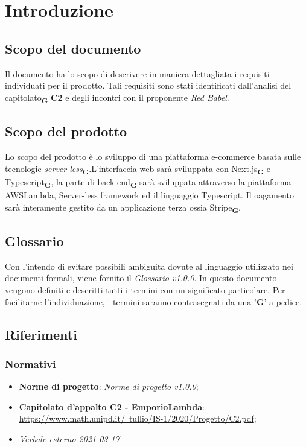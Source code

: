 \section{Introduzione}
    \subsection{Scopo del documento}
    Il documento ha lo scopo di descrivere in maniera dettagliata i requisiti individuati per il prodotto. Tali requisiti sono stati identificati dall'analisi del capitolato\textsubscript{\textbf{G}} \textbf{C2} e degli incontri con il proponente \textit{Red Babel}.
    \subsection{Scopo del prodotto}
    Lo scopo del prodotto è lo sviluppo di una piattaforma e-commerce basata sulle tecnologie \textit{server-less}\textsubscript{\textbf{G}}.L'interfaccia web sarà sviluppata con Next.js\textsubscript{\textbf{G}} e Typescript\textsubscript{\textbf{G}}, la parte di back-end\textsubscript{\textbf{G}} sarà sviluppata attraverso la piattaforma AWSLambda, Server-less framework ed il linguaggio Typescript. Il oagamento sarà interamente gestito da un applicazione terza ossia Stripe\textsubscript{\textbf{G}}.
    \subsection{Glossario}
    Con l'intendo di evitare possibili ambiguita dovute al linguaggio utilizzato nei documenti formali, viene fornito il \textit{Glossario v1.0.0}. In questo documento vengono definiti e descritti tutti i termini con un significato particolare. Per facilitarne l'individuazione, i termini saranno contrasegnati da una '\textbf{G}' a pedice.
    \subsection{Riferimenti}
    \subsubsection{Normativi}
    \begin{itemize}
        \item \textbf{Norme di progetto}: \textit{Norme di progetto v1.0.0};
        \item \textbf{Capitolato d'appalto C2 - EmporioLambda}: \href{https://www.math.unipd.it/~tullio/IS-1/2020/Progetto/C2.pdf}{https://www.math.unipd.it/~tullio/IS-1/2020/Progetto/C2.pdf};
        \item \textit{Verbale esterno 2021-03-17}
    \end{itemize}
